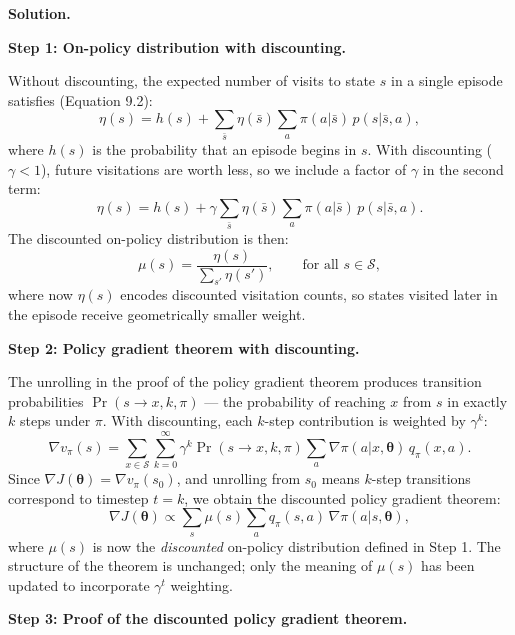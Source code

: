 \documentclass{article}
\begin{document}
\bigskip

\textbf{Solution.}

\bigskip

\textbf{Step 1: On-policy distribution with discounting.}

Without discounting, the expected number of visits to state $s$ in a single episode satisfies
(Equation 9.2):
\[
  \eta(s) = h(s) + \sum_{\bar{s}} \eta(\bar{s}) \sum_a \pi(a|\bar{s})\, p(s|\bar{s}, a),
\]
where $h(s)$ is the probability that an episode begins in $s$. With discounting ($\gamma < 1$),
future visitations are worth less, so we include a factor of $\gamma$ in the second term:
\[
  \eta(s) = h(s) + \gamma \sum_{\bar{s}} \eta(\bar{s}) \sum_a \pi(a|\bar{s})\, p(s|\bar{s}, a).
\]
The discounted on-policy distribution is then:
\[
  \mu(s) = \frac{\eta(s)}{\sum_{s'} \eta(s')}, \qquad \text{for all } s \in \mathcal{S},
\]
where now $\eta(s)$ encodes discounted visitation counts, so states visited later in the episode
receive geometrically smaller weight.

\bigskip

\textbf{Step 2: Policy gradient theorem with discounting.}

The unrolling in the proof of the policy gradient theorem produces transition probabilities
$\Pr(s \to x, k, \pi)$ — the probability of reaching $x$ from $s$ in exactly $k$ steps under $\pi$.
With discounting, each $k$-step contribution is weighted by $\gamma^k$:
\[
  \nabla v_\pi(s) = \sum_{x \in \mathcal{S}} \sum_{k=0}^{\infty} \gamma^k \Pr(s \to x, k, \pi)
  \sum_a \nabla \pi(a|x, \boldsymbol{\theta})\, q_\pi(x, a).
\]
Since $\nabla J(\boldsymbol{\theta}) = \nabla v_\pi(s_0)$, and unrolling from $s_0$ means $k$-step
transitions correspond to timestep $t = k$, we obtain the discounted policy gradient theorem:
\[
  \nabla J(\boldsymbol{\theta}) \propto \sum_s \mu(s) \sum_a q_\pi(s, a)\, \nabla \pi(a|s, \boldsymbol{\theta}),
  \tag{13.5$'$}
\]
where $\mu(s)$ is now the \emph{discounted} on-policy distribution defined in Step 1. The
structure of the theorem is unchanged; only the meaning of $\mu(s)$ has been updated to
incorporate $\gamma^t$ weighting.

\bigskip

\textbf{Step 3: Proof of the discounted policy gradient theorem.}
\end{document}
